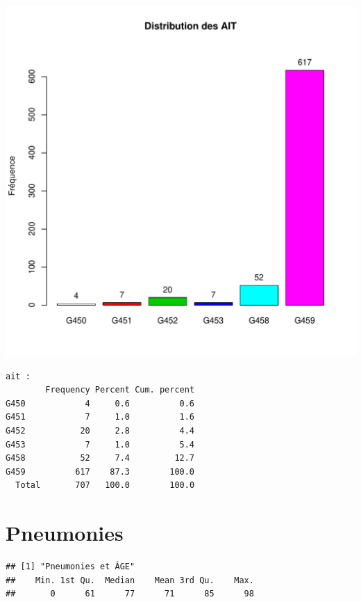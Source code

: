 \documentclass[12pt,english,french,twoside]{book}\usepackage[]{graphicx}\usepackage[]{color}
\makeatletter
\def\maxwidth{ %
  \ifdim\Gin@nat@width>\linewidth
    \linewidth
  \else
    \Gin@nat@width
  \fi
}
\newenvironment{kframe}{%
 \def\at@end@of@kframe{}%
 \ifinner\ifhmode%
  \def\at@end@of@kframe{\end{minipage}}%
  \begin{minipage}{\columnwidth}%
 \fi\fi%
 \def\FrameCommand##1{\hskip\@totalleftmargin \hskip-\fboxsep
 \colorbox{shadecolor}{##1}\hskip-\fboxsep
     \hskip-\linewidth \hskip-\@totalleftmargin \hskip\columnwidth}%
 \MakeFramed {\advance\hsize-\width
   \@totalleftmargin\z@ \linewidth\hsize
   \@setminipage}}%
 {\par\unskip\endMakeFramed%
 \at@end@of@kframe}
\newenvironment{knitrout}{}{} %
\makeatother
\begin{document}
\begin{knitrout}
\color{fgcolor}
\includegraphics[width=\maxwidth]{figure/ait} 
\begin{kframe}\begin{verbatim}
ait :  
        Frequency Percent Cum. percent
G450            4     0.6          0.6
G451            7     1.0          1.6
G452           20     2.8          4.4
G453            7     1.0          5.4
G458           52     7.4         12.7
G459          617    87.3        100.0
  Total       707   100.0        100.0
\end{verbatim}
\end{kframe}
\end{knitrout}


\section{Pneumonies}

\begin{knitrout}
\color{fgcolor}\begin{kframe}
\begin{verbatim}
## [1] "Pneumonies et ÂGE"
##    Min. 1st Qu.  Median    Mean 3rd Qu.    Max. 
##       0      61      77      71      85      98
\end{verbatim}
\end{kframe}
\end{knitrout}
\end{document}
